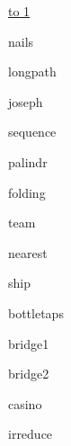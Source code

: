 \documentclass[12pt,a4paper,oneside]{article}
\newcommand{\ProblemLabel}{undefined}
\newcommand{\ProblemTL}{undefined}
\newcommand{\ProblemML}{undefined}
\newcommand{\ProblemName}{undefined}
\def\probl#1#2#3#4#5{
  \renewcommand{\ProblemName}{#2}
  \renewcommand{\ProblemLabel}{#3}
  \renewcommand{\ProblemTL}{#4}
  \renewcommand{\ProblemML}{#5}
  {#2}
}
\begin{document}
\vspace{2em}
\tableofcontents

\vspace{1em}
\noindent \underline{\hbox to 1\textwidth{{ } \hfil{ } \hfil{ } }}

\pagebreak

\probl{2012-01}{nails}{A}{0.5 sec}{256 mb}      %
\probl{2011-10}{longpath}{B}{0.5 sec}{256 mb}   %
\probl{2011-12}{joseph}{C}{0.5 sec}{256 mb}     
\probl{2014-10}{sequence}{D}{0.5 sec}{256 mb}   %
\probl{2014-10}{palindr}{E}{0.5 sec}{256 mb}    %
\probl{2014-03}{folding}{F}{0.5 sec}{256 mb}    %
\probl{2011-10}{team}{G}{0.5 sec}{256 mb}       %
\probl{2012-01}{nearest}{H}{2 sec}{16 mb}     %
\probl{2014-10}{ship}{I}{3 sec}{256 mb}       %
\probl{2014-10}{bottletaps}{J}{1 sec}{256 mb} %
\probl{2011-12}{bridge1}{K}{0.5 sec}{256 mb}     
\probl{2015-06}{bridge2}{L}{1 sec}{256 mb}     %
\probl{2014-11}{casino}{M}{1 sec}{256 mb}     %
\probl{2014-10}{irreduce}{N}{0.5 sec}{256 mb}   %
\end{document}
